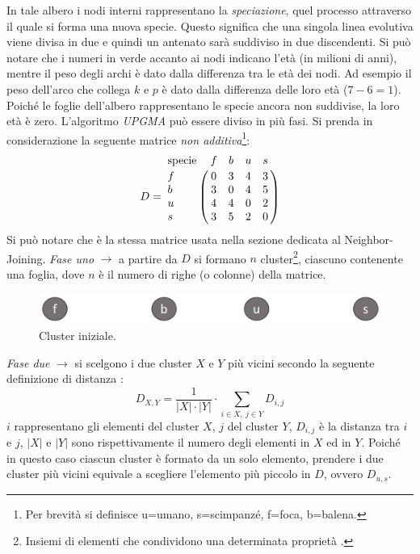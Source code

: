 \newline
In tale albero i nodi interni rappresentano la \textit{speciazione}, quel processo attraverso il quale si forma una nuova specie. Questo significa che una singola linea evolutiva viene divisa in due \cite{speciationBritannica} e quindi un antenato sarà suddiviso in due discendenti. Si può notare che i numeri in verde accanto ai nodi indicano l'età (in milioni di anni), mentre il peso degli archi è dato dalla differenza tra le età dei nodi. Ad esempio il peso dell'arco che collega $k$ e $p$ è dato dalla differenza delle loro età ($7-6=1$). Poiché le foglie dell'albero rappresentano le specie ancora non suddivise, la loro età è zero.
\newline
L'algoritmo \textit{UPGMA} può essere diviso in più fasi. Si prenda in considerazione la seguente matrice \textit{non additiva}\footnote{Per brevità si definisce u=umano, s=scimpanzé, f=foca, b=balena.}:
\[
D = \bordermatrix{\text{specie}&f&b&u&s\cr
                f& 0 & 3 & 4 & 3\cr
                b& 3 & 0 & 4 & 5\cr
                u& 4 & 4 & 0 & 2\cr
                s& 3 & 5 & 2 & 0}
\]
Si può notare che è la stessa matrice usata nella sezione dedicata al Neighbor-Joining.
\newline
\textit{Fase uno} $\rightarrow$ a partire da $D$ si formano $n$ cluster\footnote{Insiemi di elementi che condividono una determinata proprietà \cite{cambdrigeClusterDef}.}, ciascuno contenente una foglia, dove $n$ è il numero di righe (o colonne) della matrice.
\begin{figure}[h!]
\centering
	\includegraphics[height=1cm, width=12cm, keepaspectratio]{rooted_upgma_2.jpg}
 	\caption{Cluster iniziale.}
  	\label{fig:rooted_upgma_2}
\end{figure}
\newline
\textit{Fase due} $\rightarrow$ si scelgono i due cluster $X$ e $Y$ più vicini secondo la seguente definizione di distanza \cite{understandingBioinf}:
\[
D_{X,Y}=\frac{1}{\left | X \right |\cdot \left | Y \right |} \cdot \sum_{i\in X,\: j\in Y}D_{i,j}
\]
$i$ rappresentano gli elementi del cluster $X$, $j$ del cluster $Y$, $D_{i,j}$ è la distanza tra $i$ e $j$, $ \left | X \right | $ e $ \left | Y \right | $ sono rispettivamente il numero degli elementi in $X$ ed in $Y$. Poiché in questo caso  ciascun cluster è formato da un solo elemento, prendere i due cluster più vicini equivale a scegliere l'elemento più piccolo in $D$, ovvero $D_{u,s}$.
